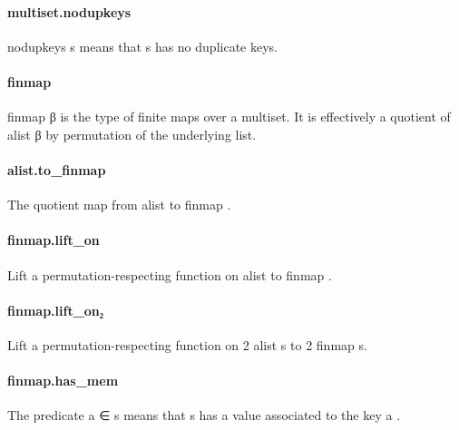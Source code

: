 \documentclass{article}
\begin{document}
\paragraph{multiset.nodupkeys}
\par
\colorbox[RGB]{253,246,227}{{{{\color[RGB]{101, 123, 131} nodupkeys s }}}} means that 
\colorbox[RGB]{253,246,227}{{{{\color[RGB]{101, 123, 131} s }}}} has no duplicate keys.
\paragraph{finmap}
\par
\colorbox[RGB]{253,246,227}{{{{\color[RGB]{101, 123, 131} finmap β }}}} is the type of finite maps over a multiset. It is effectively
a quotient of 
\colorbox[RGB]{253,246,227}{{{{\color[RGB]{101, 123, 131} alist β }}}} by permutation of the underlying list.
\paragraph{alist.to\_finmap}
\par
The quotient map from 
\colorbox[RGB]{253,246,227}{{{{\color[RGB]{101, 123, 131} alist }}}} to 
\colorbox[RGB]{253,246,227}{{{{\color[RGB]{101, 123, 131} finmap }}}}.
\paragraph{finmap.lift\_on}
\par
Lift a permutation-respecting function on 
\colorbox[RGB]{253,246,227}{{{{\color[RGB]{101, 123, 131} alist }}}} to 
\colorbox[RGB]{253,246,227}{{{{\color[RGB]{101, 123, 131} finmap }}}}.
\paragraph{finmap.lift\_on₂}
\par
Lift a permutation-respecting function on 2 
\colorbox[RGB]{253,246,227}{{{{\color[RGB]{101, 123, 131} alist }}}}s to 2 
\colorbox[RGB]{253,246,227}{{{{\color[RGB]{101, 123, 131} finmap }}}}s.
\paragraph{finmap.has\_mem}
\par
The predicate 
\colorbox[RGB]{253,246,227}{{{{\color[RGB]{101, 123, 131} a ∈ s }}}} means that 
\colorbox[RGB]{253,246,227}{{{{\color[RGB]{101, 123, 131} s }}}} has a value associated to the key 
\colorbox[RGB]{253,246,227}{{{{\color[RGB]{101, 123, 131} a }}}}.
\end{document}
